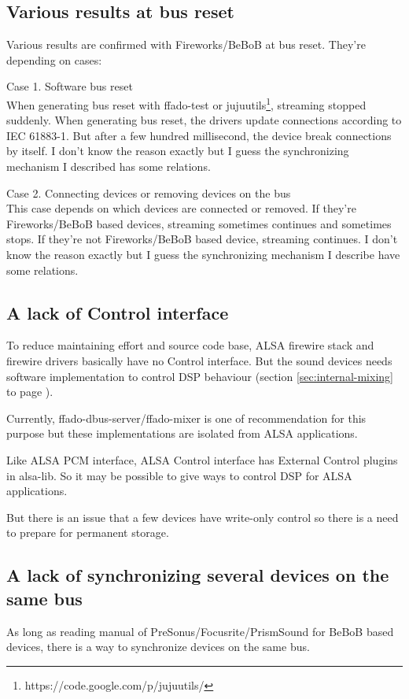 \documentclass[onecolumn]{article}
\begin{document}
\subsection{Various results at bus reset}
Various results are confirmed with Fireworks/BeBoB at bus reset. They're depending on cases:
\begin{description}
\item{Case 1. Software bus reset} \mbox{} \\
When generating bus reset with ffado-test or jujuutils\footnote{https://code.google.com/p/jujuutils/}, streaming stopped suddenly. When generating bus reset, the drivers update connections according to IEC 61883-1. But after a few hundred millisecond, the device break connections by itself. I don't know the reason exactly but I guess the synchronizing mechanism I described has some relations.
\item{Case 2. Connecting devices or removing devices on the bus} \mbox{} \\
This case depends on which devices are connected or removed. If they're Fireworks/BeBoB based devices, streaming sometimes continues and sometimes stops. If they're not Fireworks/BeBoB based device, streaming continues. I don't know the reason exactly but I guess the synchronizing mechanism I describe have some relations. 
\end{description}

\subsection{A lack of Control interface}

To reduce maintaining effort and source code base, ALSA firewire stack and firewire drivers basically have no Control interface. But the sound devices needs software implementation to control DSP behaviour (section \ref{sec:internal-mixing} to page \pageref{sec:internal-mixing}).

Currently, ffado-dbus-server/ffado-mixer is one of recommendation for this purpose but these implementations are isolated from ALSA applications.

Like ALSA PCM interface, ALSA Control interface has External Control plugins in alsa-lib. So it may be possible to give ways to control DSP for ALSA applications.

But there is an issue that a few devices have write-only control so there is a need to prepare for permanent storage.


\subsection{A lack of synchronizing several devices on the same bus}
As long as reading manual of PreSonus/Focusrite/PrismSound for BeBoB based devices, there is a way to synchronize devices on the same bus.
\end{document}
